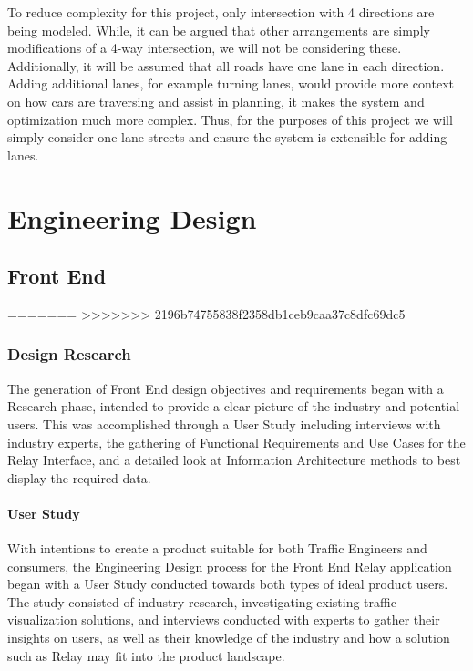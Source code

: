 \documentclass{report}
\begin{document}
To reduce complexity for this project, only intersection with 4 directions are being modeled. 
While, it can be argued that other arrangements are simply modifications of a 4-way intersection, we will not be considering these. 
Additionally, it will be assumed that all roads have one lane in each direction. 
Adding additional lanes, for example turning lanes, would provide more context on how cars are traversing and assist in planning, it makes the system and optimization much more complex. 
Thus, for the purposes of this project we will simply consider one-lane streets and ensure the system is extensible for adding lanes.


\newpage
\chapter{Engineering Design}

\section{Front End}

=======
>>>>>>> 2196b74755838f2358db1ceb9caa37c8dfc69dc5
\subsection{Design Research}
The generation of Front End design objectives and requirements began with a Research phase, intended to provide a clear picture of the industry and potential users.
This was accomplished through a User Study including interviews with industry experts, the gathering of Functional Requirements and Use Cases for the Relay Interface, and a detailed look at Information Architecture methods to best display the required data.

\subsubsection{User Study}
With intentions to create a product suitable for both Traffic Engineers and consumers, the Engineering Design process for the Front End Relay application began with a User Study conducted towards both types of ideal product users.
The study consisted of industry research, investigating existing traffic visualization solutions, and interviews conducted with experts to gather their insights on users, as well as their knowledge of the industry and how a solution such as Relay may fit into the product landscape. 
\end{document}
